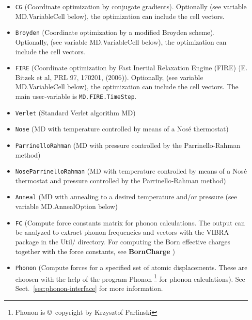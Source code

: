 \documentclass[11pt]{article}
\begin{document}
\begin{itemize}

\item {\tt CG} (Coordinate optimization by conjugate
  gradients). Optionally (see variable MD.VariableCell below), the
  optimization can include the cell vectors.

\item {\tt Broyden} (Coordinate optimization by a modified Broyden
  scheme). Optionally, (see variable MD.VariableCell below), the
  optimization can include the cell vectors.

\item {\tt FIRE} (Coordinate optimization by Fast Inertial Relaxation
  Engine (FIRE) (E. Bitzek et al, PRL 97, 170201, (2006)).
  Optionally, (see variable MD.VariableCell below), the
  optimization can include the cell vectors. The main user-variable
  is {\tt MD.FIRE.TimeStep}.

\item {\tt Verlet} (Standard Verlet algorithm MD)

\item {\tt Nose}  (MD with temperature controlled  by means of a Nos\'e 
thermostat)

\item {\tt ParrinelloRahman}  (MD with pressure controlled by 
the Parrinello-Rahman method)

\item {\tt NoseParrinelloRahman}  (MD with temperature controlled
by means of a Nos\'e thermostat and pressure controlled by 
the Parrinello-Rahman method)

\item {\tt Anneal}  (MD with annealing to a desired
temperature and/or pressure (see variable MD.AnnealOption below)

\item {\tt FC} (Compute force constants matrix for phonon calculations. The output can be analyzed to
  extract phonon frequencies and vectors with the VIBRA
  package in the Util/ directory. For computing the Born effective
  charges together with the force constants, see {\bf BornCharge}
  )

\item {\tt Phonon} (Compute forces for a specified set of atomic
  displacements. These are choosen with the help of the program {\sc
    Phonon} \footnote{{\sc Phonon} is \copyright\ copyright by
    Krzysztof Parlinski}   for phonon
  calculations). See Sect.~\ref{sec:phonon-interface} for more
  information.


\end{itemize}
\end{document}
